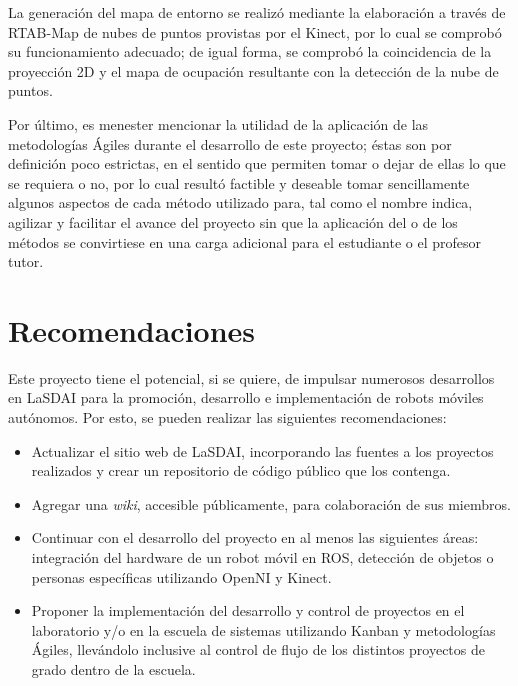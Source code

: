 La generación del mapa de entorno se realizó mediante la elaboración a través de RTAB-Map de nubes de puntos provistas por el Kinect, por lo cual se comprobó su funcionamiento adecuado; de igual forma, se comprobó la coincidencia de la proyección 2D y el mapa de ocupación resultante con la detección de la nube de puntos.

Por último, es menester mencionar la utilidad de la aplicación de las metodologías Ágiles durante el desarrollo de este proyecto; éstas son por definición poco estrictas, en el sentido que permiten tomar o dejar de ellas lo que se requiera o no, por lo cual resultó factible y deseable tomar sencillamente algunos aspectos de cada método utilizado para, tal como el nombre indica, agilizar y facilitar el avance del proyecto sin que la aplicación del o de los métodos se convirtiese en una carga adicional para el estudiante o el profesor tutor.

\section{Recomendaciones}

Este proyecto tiene el potencial, si se quiere, de impulsar numerosos desarrollos en LaSDAI para la promoción, desarrollo e implementación de robots móviles autónomos. Por esto, se pueden realizar las siguientes recomendaciones:

\begin{itemize}
	\itemsep1pt \parskip1pt 
	\item Actualizar el sitio web de LaSDAI, incorporando las fuentes a los proyectos realizados y crear un repositorio de código público que los contenga.

	\item Agregar una \textit{wiki}, accesible públicamente, para colaboración de sus miembros.

	\item Continuar con el desarrollo del proyecto en al menos las siguientes áreas: integración del hardware de un robot móvil en ROS, detección de objetos o personas específicas utilizando OpenNI y Kinect.

	\item Proponer la implementación del desarrollo y control de proyectos en el laboratorio y/o en la escuela de sistemas utilizando Kanban y metodologías Ágiles, llevándolo inclusive al control de flujo de los distintos proyectos de grado dentro de la escuela.
\end{itemize}